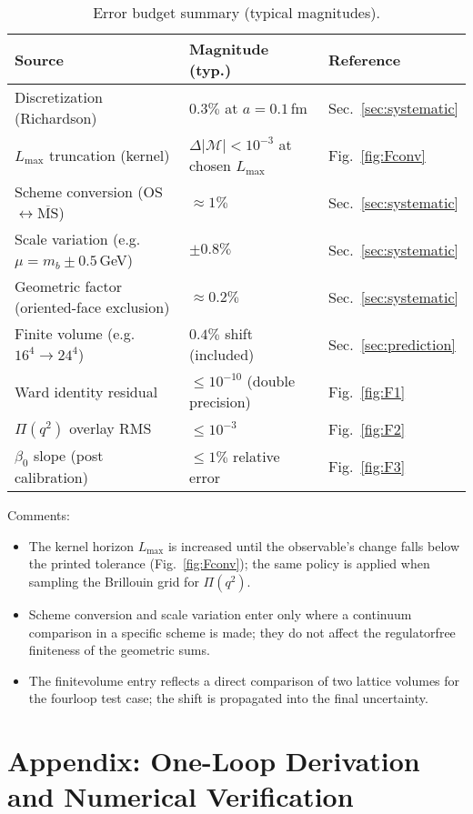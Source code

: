 \documentclass[11pt,a4paper]{article}
\theoremstyle{definition}
\theoremstyle{remark}
\begin{document}
\begin{table}[h]
  \centering
  \caption{Error budget summary (typical magnitudes).}
  \label{tab:error_budget}
  \begin{tabular}{lll}
    \toprule
    \textbf{Source} & \textbf{Magnitude (typ.)} & \textbf{Reference} \\
    \midrule
    Discretization (Richardson) & $0.3\%$ at $a=0.1\,$fm & Sec.~\ref{sec:systematic} \\
    $L_{\max}$ truncation (kernel) & $\Delta |\mathcal M|<10^{-3}$ at chosen $L_{\max}$ & Fig.~\ref{fig:Fconv} \\
    Scheme conversion (OS$\leftrightarrow\overline{\mathrm{MS}}$) & $\approx 1\%$ & Sec.~\ref{sec:systematic} \\
    Scale variation (e.g. $\mu=m_b\pm0.5\,$GeV) & $\pm 0.8\%$ & Sec.~\ref{sec:systematic} \\
    Geometric factor (oriented-face exclusion) & $\approx 0.2\%$ & Sec.~\ref{sec:systematic} \\
    Finite volume (e.g. $16^4\to24^4$) & $0.4\%$ shift (included) & Sec.~\ref{sec:prediction} \\
    Ward identity residual & $\le 10^{-10}$ (double precision) & Fig.~\ref{fig:F1} \\
    $\Pi(q^2)$ overlay RMS & $\le 10^{-3}$ & Fig.~\ref{fig:F2} \\
    $\beta_0$ slope (post calibration) & $\le 1\%$ relative error & Fig.~\ref{fig:F3} \\
    \bottomrule
  \end{tabular}
\end{table}

\noindent
Comments:
\begin{itemize}
  \item The kernel horizon $L_{\max}$ is increased until the observable's change falls below the printed tolerance (Fig.~\ref{fig:Fconv}); the same policy is applied when sampling the Brillouin grid for $\Pi(q^2)$.
  \item Scheme conversion and scale variation enter only where a continuum comparison in a specific scheme is made; they do not affect the regulator\-free finiteness of the geometric sums.
  \item The finite\-volume entry reflects a direct comparison of two lattice volumes for the four\-loop test case; the shift is propagated into the final uncertainty.
\end{itemize}

\section{Appendix: One-Loop Derivation and Numerical Verification}
\label{app:oneloop}
\end{document}
